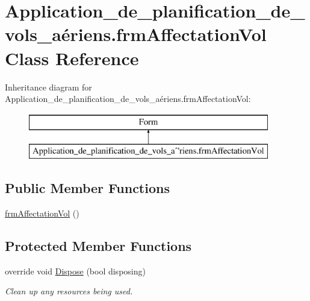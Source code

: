 \hypertarget{class_application__de__planification__de__vols__a_xC3_xA9riens_1_1frm_affectation_vol}{}\section{Application\+\_\+de\+\_\+planification\+\_\+de\+\_\+vols\+\_\+aériens.\+frm\+Affectation\+Vol Class Reference}
\label{class_application__de__planification__de__vols__a_xC3_xA9riens_1_1frm_affectation_vol}
Inheritance diagram for Application\+\_\+de\+\_\+planification\+\_\+de\+\_\+vols\+\_\+aériens.\+frm\+Affectation\+Vol\+:\begin{figure}[H]
\begin{center}
\leavevmode
\includegraphics[height=2.000000cm]{class_application__de__planification__de__vols__a_xC3_xA9riens_1_1frm_affectation_vol}
\end{center}
\end{figure}
\subsection*{Public Member Functions}
\begin{DoxyCompactItemize}
\item 
\hyperlink{class_application__de__planification__de__vols__a_xC3_xA9riens_1_1frm_affectation_vol_aa24ceb68318baf83c2c5ed0661ac30dc}{frm\+Affectation\+Vol} ()
\end{DoxyCompactItemize}
\subsection*{Protected Member Functions}
\begin{DoxyCompactItemize}
\item 
override void \hyperlink{class_application__de__planification__de__vols__a_xC3_xA9riens_1_1frm_affectation_vol_a6964af23542006f8b01d264529a8298d}{Dispose} (bool disposing)
\begin{DoxyCompactList}\small\item\em Clean up any resources being used. \end{DoxyCompactList}\end{DoxyCompactItemize}


